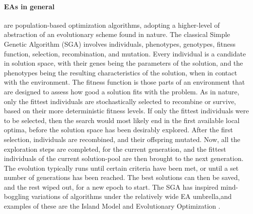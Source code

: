 \paragraph{EAs in general} are population-based optimization algorithms, adopting a higher-level of abstraction of an evolutionary scheme found in nature.
The classical Simple Genetic Algorithm (SGA) involves individuals, phenotypes, genotypes, fitness function, selection, recombination, and mutation.
Every individual is a candidate in solution space, with their genes being the parameters of the solution, and the phenotypes being the resulting characteristics of the solution, when in contact with the environment.
The fitness function is those parts of an environment that are designed to assess how good a solution fits with the problem.
As in nature, only the fittest individuals are stochastically selected to recombine or survive, based on their more deterministic fitness levels.
If only the fittest individuals were to be selected, then the search would most likely end in the first available local optima,
before the solution space has been desirably explored. After the first selection, individuals are recombined, and their offspring mutated.
Now, all the exploration steps are completed, for the current generation, and the fittest individuals of the current solution-pool are then brought to the next generation.
The evolution typically runs until certain criteria have been met, or until a set number of generations has been reached.
The best solutions can then be saved, and the rest wiped out, for a new epoch to start. \cite{eiben_introduction_2015}
The SGA has inspired mind-boggling variations of algorithms under the relatively wide EA umbrella,and examples of these are the
Island Model \cite{schuman_parallel_2016} and Evolutionary Optimization \cite{schuman_evolutionary_2016}.



